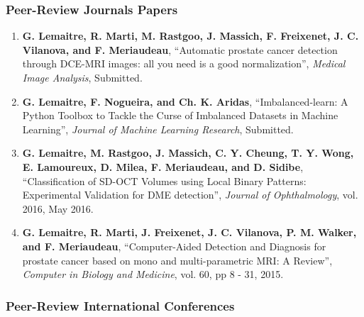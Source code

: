\begin{publication}

\subsubsection*{Peer-Review Journals Papers}

\begin{enumerate}\scriptsize
\item \textbf{G. Lemaitre, R. Marti, M. Rastgoo, J. Massich, F. Freixenet, J. C. Vilanova, and F. Meriaudeau}, ``Automatic prostate cancer detection through DCE-MRI images: all you need is a good normalization'', \textit{Medical Image Analysis}, Submitted.
\item \textbf{G. Lemaitre, F. Nogueira, and Ch. K. Aridas}, ``Imbalanced-learn: A Python Toolbox to Tackle the Curse of Imbalanced Datasets in Machine Learning'', \textit{Journal of Machine Learning Research}, Submitted.
\item \textbf{G. Lemaitre, M. Rastgoo, J. Massich, C. Y. Cheung, T. Y. Wong, E. Lamoureux, D. Milea, F. Meriaudeau, and D. Sidibe}, ``Classification of SD-OCT Volumes using Local Binary Patterns: Experimental Validation for DME detection'', \textit{Journal of Ophthalmology}, vol. 2016, May 2016.
\item \textbf{G. Lemaitre, R. Marti, J. Freixenet, J. C. Vilanova, P. M. Walker, and F. Meriaudeau}, ``Computer-Aided Detection and Diagnosis for prostate cancer based on mono and multi-parametric MRI: A Review'', \textit{Computer in Biology and Medicine}, vol. 60, pp 8 - 31, 2015.
\end{enumerate}

\subsubsection*{Peer-Review International Conferences}


\end{publication}
